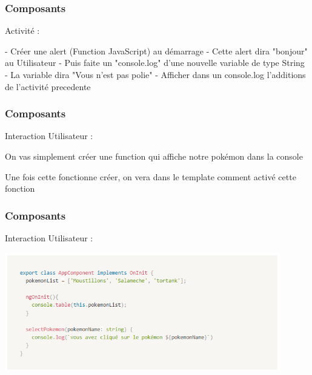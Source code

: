 \documentclass[10pt]{beamer}
\begin{document}
	\begin{frame}
		\frametitle{Composants}

		Activité : \newline \newline

		- Créer une alert (Function JavaScript) au démarrage \newline
		- Cette alert dira "bonjour" au Utilisateur \newline \newline
		- Puis faite un "console.log" d'une nouvelle variable de type String \newline
		- La variable dira "Vous n'est pas polie" \newline \newline
		- Afficher dans un console.log l'additions de l'activité precedente

	\end{frame}

	\begin{frame}
		\frametitle{Composants}

		Interaction Utilisateur : \newline \newline

		On vas simplement créer une function qui affiche notre pokémon dans la console \newline \newline

		Une fois cette fonctionne créer, on vera dans le template comment activé cette fonction


	\end{frame}

	\begin{frame}
		\frametitle{Composants}

		Interaction Utilisateur : \newline \newline


		\centering
		\includegraphics[width=12cm]{assets/userInt} \newline


	\end{frame}
\end{document}
